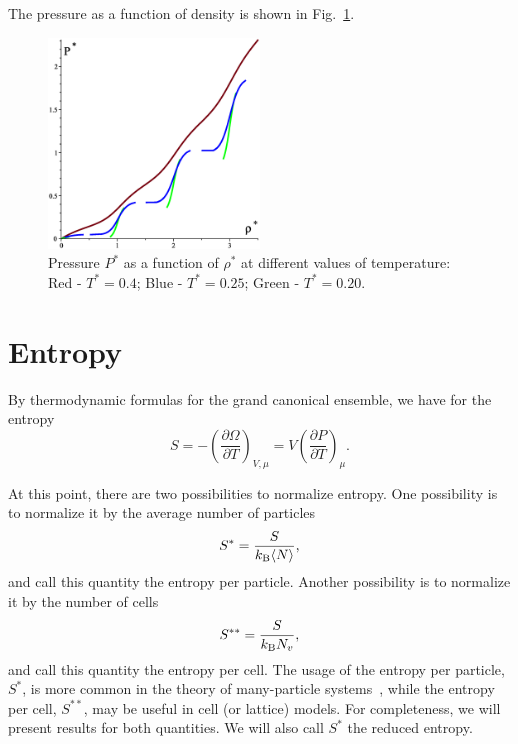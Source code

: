 \documentclass[12pt]{article}
\numberwithin{equation}{section}
\begin{document}
	The pressure as a function of density is shown in Fig.~\ref{fig:p_vs_rho_a1}.
	
	\begin{figure}[htbp]
		\includegraphics[width=0.5\textwidth,angle=0]{images/p_vs_rho_a1}
		\centering
		\captionsetup{width=0.6\textwidth}
		\caption{Pressure $P^*$ as a function of $\rho^*$ at different values of temperature: Red - $T^*=0.4$; Blue - $T^*=0.25$; Green - $T^*=0.20$.}
		\label{fig:p_vs_rho_a1}
	\end{figure}
	
	
	\pagebreak
	\section{Entropy}
	By thermodynamic formulas for the grand canonical ensemble, we have for the entropy
	\begin{equation}
		S = -\left(\frac{\partial \Omega}{\partial T}\right)_{V,\mu} = V\left(\frac{\partial P}{\partial T}\right)_{\mu}.
	\end{equation} 
	
	At this point, there are two possibilities to normalize entropy. One possibility is to normalize it by the average number of particles
	\begin{equation}
		S^{*} = \frac{S}{k_{\rm B} \langle N \rangle},
	\end{equation}
	and call this quantity the entropy per particle. Another possibility is to normalize it by the number of cells
	\begin{equation}
		S^{**} = \frac{S}{k_{\rm B}N_v},
	\end{equation}
	and call this quantity the entropy per cell. The usage of the entropy per particle, $S^*$, is more common in the theory of many-particle systems~\cite{HansenMcDonald13}, while the entropy per cell, $S^{**}$, may be useful in cell (or lattice) models. For completeness, we will present results for both quantities. We will also call $S^*$ the reduced entropy.
	
\end{document}
